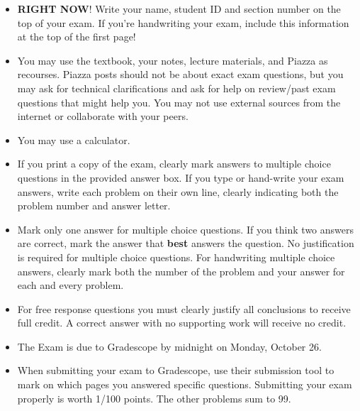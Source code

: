 \documentclass[addpoints]{exam}
\begin{document}
\begin{itemize}                        %
	\item {\bf RIGHT NOW}! Write your name, student ID and section number on the top of your exam. If you're handwriting your exam, include this information at the top of the first page!
	\item You may use the textbook, your notes, lecture materials, and Piazza as recourses.  Piazza posts should not be about exact exam questions, but you may ask for technical clarifications and ask for help on review/past exam questions that might help you.  You may not use external sources from the internet or collaborate with your peers.
	\item You may use a calculator.
	\item If you print a copy of the exam, clearly mark answers to multiple choice questions in the provided answer box. If you type or hand-write your exam answers, write each problem on their own line, clearly indicating both the problem number and answer letter.
	\item Mark only one answer for multiple choice questions.  If you think two answers are correct, mark the answer that {\bf best} answers the question.  No justification is required for multiple choice questions.  For handwriting multiple choice answers, clearly mark both the number of the problem and your answer for each and every problem.
	\item For free response questions you must clearly justify all conclusions to receive full credit.  A correct answer with no supporting work will receive no credit.
	\item The Exam is due to Gradescope by midnight on Monday, October 26.
	\item When submitting your exam to Gradescope, use their submission tool to mark on which pages you answered specific questions.  Submitting your exam properly is worth 1/100 points.  The other problems sum to 99.
\end{itemize}
\clearpage

\end{document}
